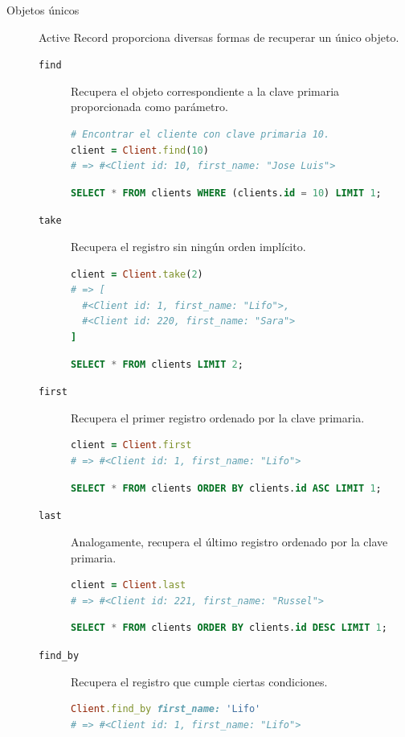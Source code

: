 \begin{description}
	\item[Objetos únicos] Active Record proporciona diversas formas de recuperar un único objeto.
	\begin{description}
		\item[\texttt{find}] Recupera el objeto correspondiente a la clave primaria proporcionada como parámetro.
\begin{lstlisting}[language=Ruby]
# Encontrar el cliente con clave primaria 10.
client = Client.find(10)
# => #<Client id: 10, first_name: "Jose Luis">
\end{lstlisting}
\begin{lstlisting}[language=SQL]
SELECT * FROM clients WHERE (clients.id = 10) LIMIT 1;
\end{lstlisting}

		\item[\texttt{take}] Recupera el registro sin ningún orden implícito.
\begin{lstlisting}[language=Ruby]
client = Client.take(2)
# => [
  #<Client id: 1, first_name: "Lifo">,
  #<Client id: 220, first_name: "Sara">
]
\end{lstlisting}
\begin{lstlisting}[language=SQL]
SELECT * FROM clients LIMIT 2;
\end{lstlisting}
		
		\item[\texttt{first}] Recupera el primer registro ordenado por la clave primaria.
\begin{lstlisting}[language=Ruby]
client = Client.first
# => #<Client id: 1, first_name: "Lifo">
\end{lstlisting}
\begin{lstlisting}[language=SQL]
SELECT * FROM clients ORDER BY clients.id ASC LIMIT 1;
\end{lstlisting}

		\item[\texttt{last}] Analogamente, recupera el último registro ordenado por la clave primaria.
\begin{lstlisting}[language=Ruby]
client = Client.last
# => #<Client id: 221, first_name: "Russel">
\end{lstlisting}
\begin{lstlisting}[language=SQL]
SELECT * FROM clients ORDER BY clients.id DESC LIMIT 1;
\end{lstlisting}

		\item[\texttt{find\_by}] Recupera el registro que cumple ciertas condiciones.
\begin{lstlisting}[language=Ruby]
Client.find_by first_name: 'Lifo'
# => #<Client id: 1, first_name: "Lifo">
\end{lstlisting}
	\end{description}
	

\end{description}
